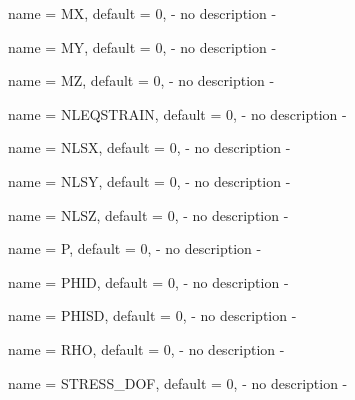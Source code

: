\begin{parameter}{
    name    = {MX},
    default = {0},
}
- no description -
\end{parameter}

\begin{parameter}{
    name    = {MY},
    default = {0},
}
- no description -
\end{parameter}

\begin{parameter}{
    name    = {MZ},
    default = {0},
}
- no description -
\end{parameter}

\begin{parameter}{
    name    = {NLEQSTRAIN},
    default = {0},
}
- no description -
\end{parameter}

\begin{parameter}{
    name    = {NLSX},
    default = {0},
}
- no description -
\end{parameter}

\begin{parameter}{
    name    = {NLSY},
    default = {0},
}
- no description -
\end{parameter}

\begin{parameter}{
    name    = {NLSZ},
    default = {0},
}
- no description -
\end{parameter}

\begin{parameter}{
    name    = {P},
    default = {0},
}
- no description -
\end{parameter}

\begin{parameter}{
    name    = {PHID},
    default = {0},
}
- no description -
\end{parameter}

\begin{parameter}{
    name    = {PHISD},
    default = {0},
}
- no description -
\end{parameter}

\begin{parameter}{
    name    = {RHO},
    default = {0},
}
- no description -
\end{parameter}

\begin{parameter}{
    name    = {STRESS_DOF},
    default = {0},
}
- no description -
\end{parameter}

